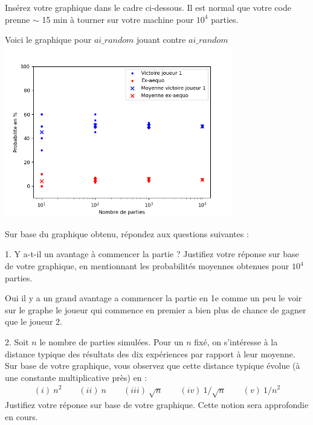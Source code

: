 \documentclass[11pt,answers]{exam}
\begin{document}
Insérez votre graphique dans le cadre ci-dessous. Il est normal que votre code prenne $\sim$ 15 min à tourner sur votre machine pour $10^4$ parties.

\begin{solutionbox}{100mm}
    Voici le graphique pour $ai\_random$ jouant contre $ai\_random$
    \centering
    \includegraphics[width=0.75\textwidth]{ai_random_plot.png}
\end{solutionbox}

Sur base du graphique obtenu, répondez aux questions suivantes :

\medskip

1. Y a-t-il un avantage à commencer la partie ? Justifiez votre réponse sur base de votre graphique, en mentionnant les probabilités moyennes obtenues pour $10^4$ parties.
    
\begin{solutionbox}{25mm}
Oui il y a un grand avantage a commencer la partie en 1e comme un peu le voir sur le graphe le joueur qui commence en premier a bien plus de chance de gagner que le joueur 2.

\end{solutionbox}

\medskip

2. Soit $n$ le nombre de parties simulées. Pour un $n$ fixé, on s'intéresse à la distance typique des résultats des dix expériences par rapport à leur moyenne. Sur base de votre graphique, vous observez que cette distance typique évolue (à une constante multiplicative près) en :
\begin{align*}
      (i) \ n^2 \qquad  (ii) \ n \qquad  (iii)\  \sqrt{n} \qquad (iv) \ 1/\sqrt{n} \qquad  (v) \  1/n^2
\end{align*}
Justifiez votre réponse sur base de votre graphique. Cette notion sera approfondie en cours.
\end{document}
